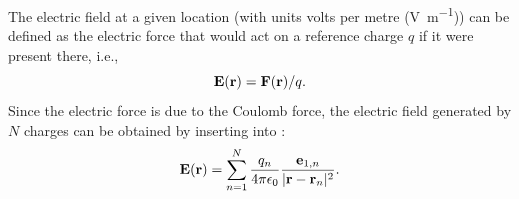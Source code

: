 

\section{}
\label{sec:Basics:Fields} 
The electric field at a given location (with units volts per metre (\si{\volt\per\metre})) can be defined as the electric force that would act on a reference charge $q$ if it were present there, i.e.,
\begin{equation}
{\bf E}({\bf r}) = {\bf F}({\bf r})/q.
\label{eq:Basics:E}
\end{equation}
Since the electric force is due to the Coulomb force, the electric field generated by $N$ charges can be obtained by inserting  into :
\begin{equation}
{\bf E}({\bf r}) = \sum_{n=1}^{N}  \frac{q_n}{4\pi \epsilon_0} \frac{{{\bf e}}_{1,n}}{|{\bf r}-{\bf r}_n|^2}.
\label{eq:Basics:CoulombEN}
\end{equation}

